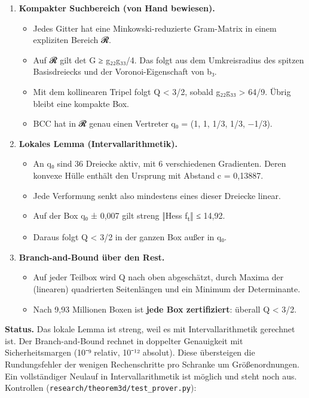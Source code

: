 \begin{enumerate}
\def\labelenumi{\arabic{enumi}.}
\tightlist
\item
  \textbf{Kompakter Suchbereich (von Hand bewiesen).}

  \begin{itemize}
  \tightlist
  \item
    Jedes Gitter hat eine Minkowski-reduzierte Gram-Matrix in einem expliziten Bereich 𝓡.
  \item
    Auf 𝓡 gilt det G ≥ g₂₂g₃₃/4. Das folgt aus dem Umkreisradius des spitzen Basisdreiecks und der Voronoi-Eigenschaft von b₃.
  \item
    Mit dem kollinearen Tripel folgt Q \textless{} 3/2, sobald g₂₂g₃₃ \textgreater{} 64/9. Übrig bleibt eine kompakte Box.
  \item
    BCC hat in 𝓡 genau einen Vertreter q₀ = (1, 1, 1/3, 1/3, −1/3).
  \end{itemize}
\item
  \textbf{Lokales Lemma (Intervallarithmetik).}

  \begin{itemize}
  \tightlist
  \item
    An q₀ sind 36 Dreiecke aktiv, mit 6 verschiedenen Gradienten. Deren konvexe Hülle enthält den Ursprung mit Abstand c = 0,13887.
  \item
    Jede Verformung senkt also mindestens eines dieser Dreiecke linear.
  \item
    Auf der Box q₀ ± 0,007 gilt streng ‖Hess f\textsubscript{t}‖ ≤ 14,92.
  \item
    Daraus folgt Q \textless{} 3/2 in der ganzen Box außer in q₀.
  \end{itemize}
\item
  \textbf{Branch-and-Bound über den Rest.}

  \begin{itemize}
  \tightlist
  \item
    Auf jeder Teilbox wird Q nach oben abgeschätzt, durch Maxima der (linearen) quadrierten Seitenlängen und ein Minimum der Determinante.
  \item
    Nach 9,93 Millionen Boxen ist \textbf{jede Box zertifiziert}: überall Q \textless{} 3/2.
  \end{itemize}
\end{enumerate}

\textbf{Status.} Das lokale Lemma ist streng, weil es mit Intervallarithmetik gerechnet ist. Der Branch-and-Bound rechnet in doppelter Genauigkeit mit Sicherheitsmargen (10⁻⁹ relativ, 10⁻¹² absolut). Diese übersteigen die Rundungsfehler der wenigen Rechenschritte pro Schranke um Größenordnungen. Ein vollständiger Neulauf in Intervallarithmetik ist möglich und steht noch aus. Kontrollen (\texttt{research/theorem3d/test\_prover.py}):

